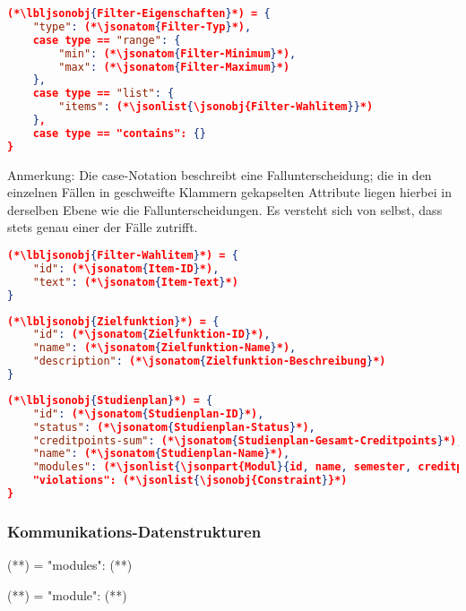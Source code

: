 \begin{lstlisting}[language=json]
(*\lbljsonobj{Filter-Eigenschaften}*) = {
	"type": (*\jsonatom{Filter-Typ}*),
	case type == "range": {
		"min": (*\jsonatom{Filter-Minimum}*),
		"max": (*\jsonatom{Filter-Maximum}*)
	},
	case type == "list": {
		"items": (*\jsonlist{\jsonobj{Filter-Wahlitem}}*)
	},
	case type == "contains": {}
}
\end{lstlisting}
\vspace{-\baselineskip}
Anmerkung: Die case-Notation beschreibt eine Fallunterscheidung; die in den einzelnen Fällen in geschweifte Klammern gekapselten Attribute liegen hierbei in derselben Ebene wie die Fallunterscheidungen. Es versteht sich von selbst, dass stets genau einer der Fälle zutrifft.
\vspace{\baselineskip}

\begin{lstlisting}[language=json]
(*\lbljsonobj{Filter-Wahlitem}*) = {
	"id": (*\jsonatom{Item-ID}*),
	"text": (*\jsonatom{Item-Text}*)
}
\end{lstlisting}

\begin{lstlisting}[language=json]
(*\lbljsonobj{Zielfunktion}*) = {
	"id": (*\jsonatom{Zielfunktion-ID}*),
	"name": (*\jsonatom{Zielfunktion-Name}*),
	"description": (*\jsonatom{Zielfunktion-Beschreibung}*)
}
\end{lstlisting}

\begin{lstlisting}[language=json]
(*\lbljsonobj{Studienplan}*) = {
    "id": (*\jsonatom{Studienplan-ID}*),
    "status": (*\jsonatom{Studienplan-Status}*),
    "creditpoints-sum": (*\jsonatom{Studienplan-Gesamt-Creditpoints}*),
    "name": (*\jsonatom{Studienplan-Name}*),
    "modules": (*\jsonlist{\jsonpart{Modul}{id, name, semester, creditpoints, lecturer}}*),
    "violations": (*\jsonlist{\jsonobj{Constraint}}*)	
}
\end{lstlisting}

\subsubsection*{Kommunikations-Datenstrukturen}

\begin{json}
(**) = {
	"modules": (**)
}	
\end{json}

\begin{json}
(**) = {
	"module": (**)
}	
\end{json}


